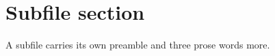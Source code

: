 \documentclass[../main.tex]{subfiles}
\begin{document}
\section{Subfile section}
A subfile carries its own preamble and three prose words more.
\end{document}
